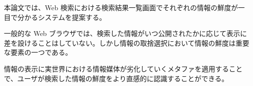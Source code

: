 


\begin{jabstract}

本論文では、Web 検索における検索結果一覧画面でそれぞれの情報の鮮度が一目で分かるシステムを提案する。

一般的な Web ブラウザでは、検索した情報がいつ公開されたかに応じて表示に差を設けることはしていない。しかし情報の取捨選択において情報の鮮度は重要な要素の一つである。

情報の表示に実世界における情報媒体が劣化していくメタファを適用することで、ユーザが検索した情報の鮮度をより直感的に認識することができる。

\end{jabstract}
